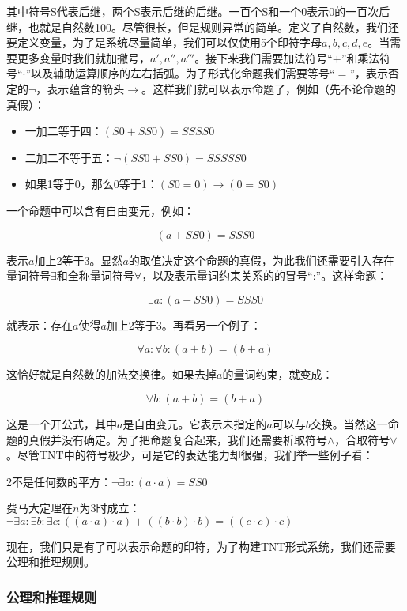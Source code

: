 \documentclass{article}
\begin{document}
其中符号S代表后继，两个S表示后继的后继。一百个S和一个0表示0的一百次后继，也就是自然数100。尽管很长，但是规则异常的简单。定义了自然数，我们还要定义变量，为了是系统尽量简单，我们可以仅使用5个印符字母$a, b, c, d, e$。当需要更多变量时我们就加撇号，$a', a'', a'''$。接下来我们需要加法符号“$+$”和乘法符号“$\cdot$”以及辅助运算顺序的左右括弧。为了形式化命题我们需要等号“$=$”，表示否定的$\lnot$，表示蕴含的箭头$\to$。这样我们就可以表示命题了，例如（先不论命题的真假）：

\begin{itemize}
\item 一加二等于四：$(S0 + SS0) = SSSS0$
\item 二加二不等于五：$\lnot (SS0 + SS0) = SSSSS0$
\item 如果1等于0，那么0等于1：$(S0 = 0) \to (0 = S0)$
\end{itemize}

一个命题中可以含有自由变元，例如：

\[
(a + SS0) = SSS0
\]

表示$a$加上2等于3。显然$a$的取值决定这个命题的真假，为此我们还需要引入存在量词符号$\exists$和全称量词符号$\forall$，以及表示量词约束关系的的冒号“:”。这样命题：

\[
\exists a : (a + SS0) = SSS0
\]

就表示：存在$a$使得$a$加上2等于3。再看另一个例子：

\[
\forall a : \forall b : (a + b) = (b + a)
\]

这恰好就是自然数的加法交换律。如果去掉$a$的量词约束，就变成：

\[
\forall b : (a + b) = (b + a)
\]

这是一个开公式，其中$a$是自由变元。它表示未指定的$a$可以与$b$交换。当然这一命题的真假并没有确定。为了把命题复合起来，我们还需要析取符号$\land$，合取符号$\lor$。尽管TNT中的符号极少，可是它的表达能力却很强，我们举一些例子看：

2不是任何数的平方：$\lnot \exists a : (a \cdot a) = SS0$

费马大定理在$n$为3时成立：$\lnot \exists a : \exists b : \exists c : ((a \cdot a) \cdot a) + ((b \cdot b) \cdot b) = ((c \cdot c) \cdot c)$

现在，我们只是有了可以表示命题的印符，为了构建TNT形式系统，我们还需要公理和推理规则。

\subsubsection{公理和推理规则}
\end{document}
